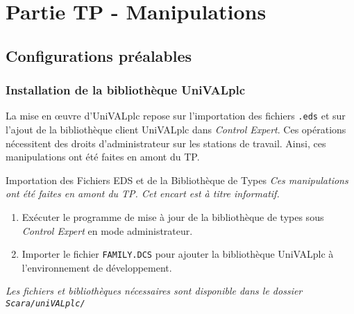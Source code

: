 
\section{Partie TP - Manipulations}


\begin{UPSTIManipulation}
\end{UPSTIManipulation}

\subsection{Configurations préalables}
\subsubsection{Installation de la bibliothèque UniVALplc}
La mise en œuvre d'UniVALplc repose sur l'importation des fichiers \texttt{.eds} et sur l'ajout de la bibliothèque client UniVALplc dans \textit{Control Expert}. Ces opérations nécessitent des droits d'administrateur sur les stations de travail.
Ainsi, ces manipulations ont été faites en amont du TP. 

\begin{UPSTIinfor}{Importation des Fichiers EDS et de la Bibliothèque de Types}
    \textit{Ces manipulations ont été faites en amont du TP. Cet encart est à titre informatif.}
    \begin{enumerate}
        \item Exécuter le programme de mise à jour de la bibliothèque de types sous \textit{Control Expert} en mode administrateur.
        \item Importer le fichier \texttt{FAMILY.DCS} pour ajouter la bibliothèque UniVALplc à l'environnement de développement.
    \end{enumerate}
    \textit{Les fichiers et bibliothèques nécessaires sont disponible dans le dossier \texttt{Scara/uniVALplc/}}
\end{UPSTIinfor}


